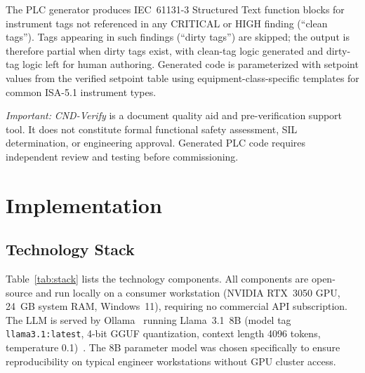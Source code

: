 \documentclass[journal]{IEEEtran}
\newcommand{\sys}{\textit{CND-Verify}}
\begin{document}
The PLC generator produces IEC~61131-3 Structured Text function blocks for
instrument tags not referenced in any CRITICAL or HIGH finding (``clean tags'').
Tags appearing in such findings (``dirty tags'') are skipped; the output is
therefore partial when dirty tags exist, with clean-tag logic generated and
dirty-tag logic left for human authoring. Generated code is parameterized with
setpoint values from the verified setpoint table using equipment-class-specific
templates for common ISA-5.1 instrument types.

\textit{Important:} \sys{} is a document quality aid and pre-verification
support tool. It does not constitute formal functional safety assessment,
SIL determination, or engineering approval. Generated PLC code requires
independent review and testing before commissioning.

\section{Implementation}
\label{sec:impl}

\subsection{Technology Stack}

Table~\ref{tab:stack} lists the technology components. All components are
open-source and run locally on a consumer workstation (NVIDIA RTX~3050 GPU,
24~GB system RAM, Windows~11), requiring no commercial API subscription.
The LLM is served by Ollama~\cite{ollama} running Llama~3.1~8B (model tag
\texttt{llama3.1:latest}, 4-bit GGUF quantization, context length 4096
tokens, temperature 0.1)~\cite{llama3}. The 8B parameter model was chosen
specifically to ensure reproducibility on typical engineer workstations without
GPU cluster access.
\end{document}
